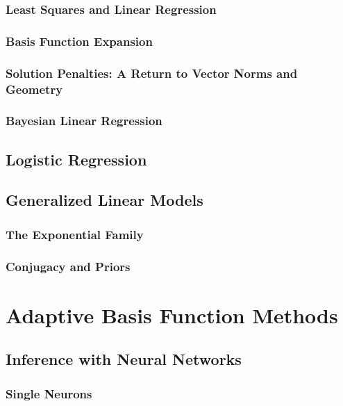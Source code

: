 \documentclass[10pt]{article}
\begin{document}
\subsubsection{Least Squares and Linear Regression}

\subsubsection{Basis Function Expansion}

\subsubsection{Solution Penalties: A Return to Vector Norms and Geometry}

\subsubsection{Bayesian Linear Regression}

\subsection{Logistic Regression}

\subsection{Generalized Linear Models}

\subsubsection{The Exponential Family}

\subsubsection{Conjugacy and Priors}

\section{Adaptive Basis Function Methods}

\subsection{Inference with Neural Networks}

\subsubsection{Single Neurons}
\end{document}
